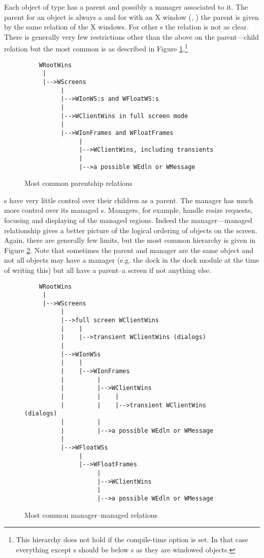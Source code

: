 
Each object of type  has a parent and possibly a manager
associated to it. The parent for an object is always a 
 and for  with an X window (,
) the parent  is given by the same relation of
the X windows. For other s the relation is not as clear.
There is generally very few restrictions other than the above on the
parent---child relation but the most common is as described in
Figure \ref{fig:parentship}.\footnote{This hierarchy does not hold
  if the compile-time option  is set. In that
  case everything except s  should be below s
  as they are windowed objects.}

\begin{figure}
\begin{verbatim}
    WRootWins
     |
     |-->WScreens
          |
          |-->WIonWS:s and WFloatWS:s
          |
          |-->WClientWins in full screen mode
          |
          |-->WIonFrames and WFloatFrames
               |
               |-->WClientWins, including transients
               |
               |-->a possible WEdln or WMessage
\end{verbatim}
\caption{Most common parentship relations}
\label{fig:parentship}
\end{figure}

s have very little control over their children as a parent.
The manager  has much more control over its
managed s. Managers, for example, handle resize requests,
focusing and displaying of the managed regions. Indeed the manager---managed
relationship gives a better picture of the logical ordering of objects on
the screen. Again, there are generally few limits, but the most common
hierarchy is given in Figure \ref{fig:managership}. Note that sometimes
the parent and manager are the same object and not all objects may have
a manager (e.g. the dock in the dock module at the time of writing this)
but all have a parent--a screen if not anything else.

\begin{figure}
\begin{verbatim}
    WRootWins
     |
     |-->WScreens
          |
          |-->full screen WClientWins
          |    |
          |    |-->transient WClientWins (dialogs)
          |
          |-->WIonWSs
          |    |
          |    |-->WIonFrames
          |         |
          |         |-->WClientWins
          |         |    |
          |         |    |-->transient WClientWins (dialogs)
          |         |
          |         |-->a possible WEdln or WMessage
          |
          |-->WFloatWSs
               |
               |-->WFloatFrames
                    |
                    |-->WClientWins
                    |
                    |-->a possible WEdln or WMessage
\end{verbatim}
\caption{Most common manager--managed relations}
\label{fig:managership}
\end{figure}


